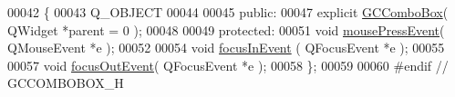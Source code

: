 \begin{DoxyCode}
00042 \{
00043   Q\_OBJECT
00044 
00045 \textcolor{keyword}{public}:
00047   \textcolor{keyword}{explicit} \hyperlink{class_g_c_combo_box_ab4d6f4af3941fe4d71eab7d8f78ac6c1}{GCComboBox}( QWidget *parent = 0 );
00048   
00049 \textcolor{keyword}{protected}:
00051   \textcolor{keywordtype}{void} \hyperlink{class_g_c_combo_box_a20358fcd497e5d179c3513d6829a1d84}{mousePressEvent}( QMouseEvent *e );
00052 
00054   \textcolor{keywordtype}{void} \hyperlink{class_g_c_combo_box_aeb5633813d3c92ee6b7759d2ae5f942d}{focusInEvent} ( QFocusEvent *e );
00055 
00057   \textcolor{keywordtype}{void} \hyperlink{class_g_c_combo_box_ab3aff530b6cac02b9eeda39b83a16411}{focusOutEvent}( QFocusEvent *e );
00058 \};
00059 
00060 \textcolor{preprocessor}{#endif // GCCOMBOBOX\_H}
\end{DoxyCode}
